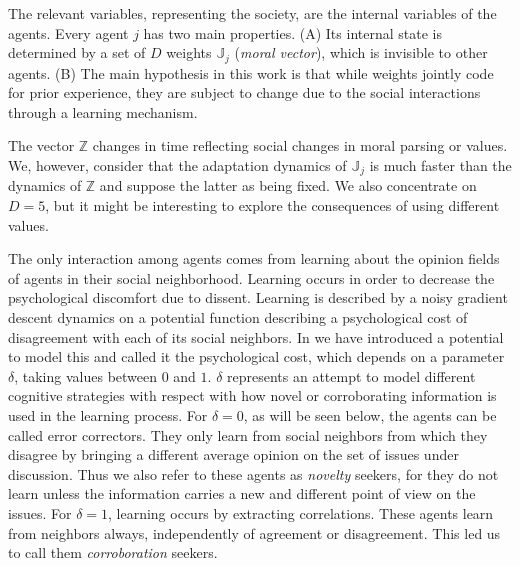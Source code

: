 \documentclass[twocolumn,showpacs]{revtex4-1}
\begin{document}
The relevant variables, representing the society, are the  internal variables of the agents.
Every agent $j$ has two main  properties. (A) Its internal state is determined by a set of  $D$ weights   
$\mathbb{J}_j$ ({\it moral vector}), which is invisible to other agents. (B) The main hypothesis in this work is that
while weights jointly code for prior experience,  they are subject to change due to the social interactions through 
a learning mechanism.

The vector $\mathbb{Z}$ changes in time reflecting social changes in moral parsing or values. We, however, consider that 
the adaptation dynamics of $\mathbb{J}_j$ is much faster than the dynamics of $\mathbb{Z}$ and suppose the 
latter as being fixed. We also concentrate on  $D=5$, but it  might be interesting  to explore the consequences of using different values. 



The only interaction among agents comes from learning about the opinion fields 
of agents in their social neighborhood.  Learning occurs in 
order to decrease the psychological discomfort due to dissent. 
Learning is described by
a noisy gradient descent dynamics on a  potential function
 describing a psychological cost of disagreement
with each of its social neighbors.
In \cite{Cavi10}
we  have introduced a potential to model this and called it the psychological cost,
which depends on a parameter $\delta$, taking values between $0$ and $1$. 
$\delta$  represents an attempt to model
different cognitive strategies with respect with how novel 
or corroborating  information
is used in the learning process.
For $\delta=0$, as will be seen below, the agents
can be called error correctors. They only learn
from social neighbors from which they disagree by  bringing a  different
average opinion on the set of issues under discussion. Thus we also refer to these agents as {\it 
novelty} seekers, for they do not learn unless the information carries
a new and different point of view on the issues. For $\delta=1$, learning occurs by extracting
correlations. These agents learn from neighbors always, independently of
agreement or disagreement. 
This led us to call them {\it corroboration} seekers. 
\end{document}
